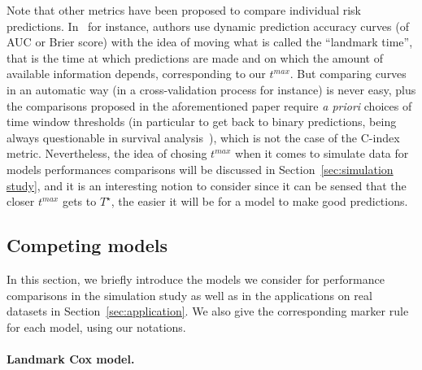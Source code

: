 \documentclass[11pt]{article}
\begin{document}
Note that other metrics have been proposed to compare individual risk predictions. In~\citet{blanche2015quantifying} for instance, authors use dynamic prediction accuracy curves (of AUC or Brier score) with the idea of moving what is called the ``landmark time'', that is the time at which predictions are made and on which the amount of available information depends, corresponding to our $t^{max}$. But comparing curves in an automatic way (in a cross-validation process for instance) is never easy, plus the comparisons proposed in the aforementioned paper require \textit{a priori} choices of time window thresholds (in particular to get back to binary predictions, being always questionable in survival analysis~\citep{bussy2019comparison}), which is not the case of the C-index metric.
Nevertheless, the idea of chosing $t^{max}$ when it comes to simulate data for models performances comparisons will be discussed in Section~\ref{sec:simulation study}, and it is an interesting notion to consider since it can be sensed that the closer $t^{max}$ gets to $T^\star$, the easier it will be for a model to make good predictions.

\subsection{Competing models}
\label{sec:competing models}

In this section, we briefly introduce the models we consider for performance comparisons in the simulation study as well as in the applications on real datasets in Section~\ref{sec:application}. We also give the corresponding marker rule for each model, using our notations.

\paragraph*{Landmark Cox model.}
\end{document}
